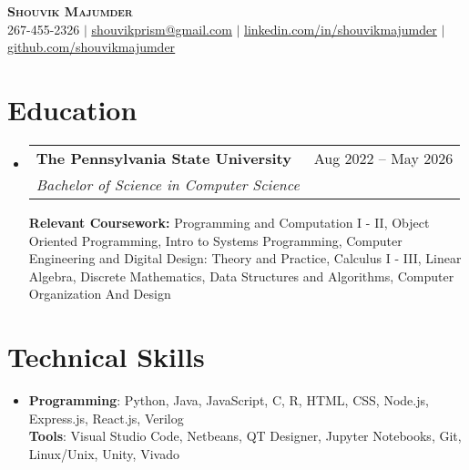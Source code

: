 \documentclass[letterpaper,11pt]{article}
\makeatletter
\newcommand{\resumeItem}[1]{
  \item\small{
    {#1 \vspace{-2pt}}
  }
}
\newcommand{\resumeSubheading}[4]{
  \vspace{-2pt}\item
    \begin{tabular*}{0.97\textwidth}[t]{l@{\extracolsep{\fill}}r}
      \textbf{#1} & #2 \\
      \textit{\small#3} & \textit{\small #4} \\
    \end{tabular*}\vspace{-7pt}
}
\newcommand{\resumeSubHeadingListStart}{\begin{itemize}[leftmargin=0.15in, label={}]}
\newcommand{\resumeSubHeadingListEnd}{\end{itemize}}
\makeatother
\begin{document}

\begin{center}
    \textbf{\Huge \scshape Shouvik Majumder} \\ \vspace{1pt}
    \small 267-455-2326 $|$ \href{shouvikprism@gmail.com}{\underline{shouvikprism@gmail.com}} $|$ 
    \href{https://www.linkedin.com/in/shouvikmajumder/}{\underline{linkedin.com/in/shouvikmajumder}} $|$  \href{https://github.com/shouvikmajumder}{\underline{github.com/shouvikmajumder}}
\end{center}


\section{Education}
  \resumeSubHeadingListStart
    \resumeSubheading
      {\textbf{The Pennsylvania State University }
}{Aug 2022 -- May 2026}
      {Bachelor of Science in Computer Science}

      \resumeItem{\textbf{Relevant Coursework: }Programming and Computation I - II, Object Oriented Programming, Intro to Systems Programming, Computer Engineering and Digital Design: Theory and Practice, Calculus I - III, Linear Algebra, Discrete Mathematics, Data Structures and Algorithms, Computer Organization And Design}
  \resumeSubHeadingListEnd


\section{Technical Skills}
  \resumeSubHeadingListStart
      \resumeItem{\textbf{Programming}{: Python, Java, JavaScript, C, R, HTML, CSS, Node.js, Express.js, React.js, Verilog} \\
     \textbf{Tools}{: Visual Studio Code, Netbeans, QT Designer, Jupyter Notebooks, Git, Linux/Unix, Unity, Vivado}}
  \resumeSubHeadingListEnd
  
\end{document}

